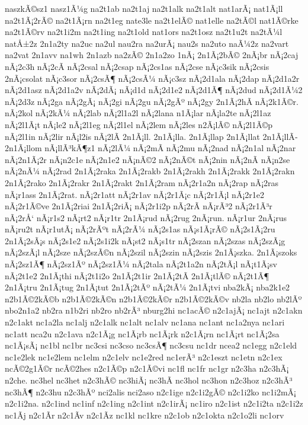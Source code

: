 {naszkÃ©sz1
nasz1Ã¼g
na2t1ab
na2t1aj
na2t1alk
na2t1alt
nat1arÃ¡
nat1Ã¡ll
na2t1Ã¡2rÃ©
na2t1Ã¡rn
na2t1eg
nate3le
na2t1elÃ©
nat1elle
na2tÃ©l
nat1Ã©rke
na2t1Ã©rv
na2t1i2m
na2t1ing
na2t1old
nat1ors
na2t1osz
na2t1u2t
na2tÃ¼l
natÅ±2z
2n1a2ty
na2uc
na2ul
nau2ra
na2urÃ¡
nau2s
na2uto
naÃ¼2z
na2vart
na2vat
2n1avv
na1wh
2n1azb
na2zÃ©
2n1a2zo
1nÃ¡
2n1Ã¡2bÃ©
2nÃ¡br
nÃ¡2caj
nÃ¡2c3h
nÃ¡2cÃ­
nÃ¡2csal
nÃ¡2csap
nÃ¡2cs1as
nÃ¡2cse
nÃ¡c3sik
nÃ¡2csis
2nÃ¡csolat
nÃ¡c3sor
nÃ¡2csÃ¶
nÃ¡2csÃ¼
nÃ¡c3sz
nÃ¡2d1ala
nÃ¡2dap
nÃ¡2d1a2r
nÃ¡2d1asz
nÃ¡2d1a2v
nÃ¡2dÃ¡
nÃ¡d1d
nÃ¡2d1e2
nÃ¡2d1Ã¶
nÃ¡2dud
nÃ¡2d1Ã¼2
nÃ¡2d3z
nÃ¡2ga
nÃ¡2gÃ¡
nÃ¡2gi
nÃ¡2gu
nÃ¡2gÃº
nÃ¡2gy
2n1Ã¡2hÃ­
nÃ¡2k1Ã©r.
nÃ¡2kol
nÃ¡2kÃ¼
nÃ¡2lab
nÃ¡2l1a2l
nÃ¡2lana
n1Ã¡lar
nÃ¡la2te
nÃ¡2l1az
nÃ¡2l1Ã¡t
nÃ¡le2
nÃ¡2l1eg
nÃ¡2l1el
nÃ¡2lem
nÃ¡2les
n2Ã¡lÃ©
nÃ¡2l1Ã©p
nÃ¡2l1in
nÃ¡2lir
nÃ¡l2is
nÃ¡2lÃ­
2n1Ã¡ll.
2n1Ã¡lla.
2n1Ã¡llap
2n1Ã¡llat
2n1Ã¡llÃ­
2n1Ã¡llom
nÃ¡llÃ³kÃ¶z1
nÃ¡2lÃ¼
nÃ¡2mÃ­
nÃ¡2mu
nÃ¡2nad
nÃ¡2n1al
nÃ¡2nar
nÃ¡2n1Ã¡2r
nÃ¡n2c1e
nÃ¡2n1e2
nÃ¡nÃ©2
nÃ¡2nÃ©t
nÃ¡2nin
nÃ¡2nÃ­
nÃ¡n2se
nÃ¡2nÃ¼
nÃ¡2rad
2n1Ã¡2raka
2n1Ã¡2rakb
2n1Ã¡2rakh
2n1Ã¡2rakk
2n1Ã¡2rakn
2n1Ã¡2rako
2n1Ã¡2rakr
2n1Ã¡2rakt
2n1Ã¡2ram
nÃ¡2r1a2n
nÃ¡2rap
nÃ¡2ras
nÃ¡r1ass
2n1Ã¡2rat.
nÃ¡2r1att
nÃ¡2r1av
nÃ¡2r1Ã¡c
nÃ¡2r1Ã¡l
nÃ¡2r1e2
nÃ¡2r1Ã©ve
2n1Ã¡2riai
2n1Ã¡2riÃ¡
nÃ¡2r1i2p
nÃ¡2rÃ­
nÃ¡rÃ³2
nÃ¡2r1Ã³r
nÃ¡2rÅ‘
nÃ¡r1s2
nÃ¡rt2
nÃ¡r1tr
2n1Ã¡rud
nÃ¡2rug
2nÃ¡run.
nÃ¡r1ur
2nÃ¡rus
nÃ¡ru2t
nÃ¡r1utÃ¡
nÃ¡2rÃºt
nÃ¡2rÃ¼
nÃ¡2s1as
nÃ¡s1Ã¡rÃ©
nÃ¡2s1Ã¡2ru
2n1Ã¡2sÃ¡s
nÃ¡2s1e2
nÃ¡2s1i2k
nÃ¡st2
nÃ¡s1tr
nÃ¡2szan
nÃ¡2szas
nÃ¡2szÃ¡g
nÃ¡2szÃ¡l
nÃ¡2sze
nÃ¡2szÃ©n
nÃ¡2szil
nÃ¡2szin
nÃ¡2szis
2n1Ã¡szka.
2n1Ã¡szoks
nÃ¡2sz1Ã¶
nÃ¡2sz1Ãº
nÃ¡2sz1Ã¼
nÃ¡2tala
nÃ¡2t1a2n
nÃ¡2tÃ¡l
nÃ¡t1Ã¡sv
nÃ¡2t1e2
2n1Ã¡thi
nÃ¡2t1i2o
2n1Ã¡2t1ir
2n1Ã¡2tÃ­
2n1Ã¡tlÃ©
nÃ¡2t1Ã¶
2n1Ã¡tru
2n1Ã¡tug
2n1Ã¡tut
2n1Ã¡2tÃº
nÃ¡2tÃ¼
2n1Ã¡tvi
nba2kÃ¡
nba2k1e2
n2b1Ã©2kÃ©b
n2b1Ã©2kÃ©n
n2b1Ã©2kÃ©r
n2b1Ã©2kÃ©v
nb2la
nb2lo
nb2lÃº
nbo2n1a2
nb2ra
n1b2ri
nb2ro
nb2rÃ³
nburg2hi
nc1acÃ©
n2c1ajÃ¡
nc1ajt
n2c1akn
n2c1akt
nc1a2la
nc1alj
n2c1alk
nc1alt
nc1alv
nc1ana
nc1ant
nc1a2nya
nc1ari
nc1att
nca2u
n2c1ava
n2c1Ã¡g
nc1Ã¡rb
nc1Ã¡rk
n2c1Ã¡rn
nc1Ã¡rt
nc1Ã¡2sa
nc1Ã¡sÃ¡
nc1bl
nc1br
nc3csi
nc3cso
nc3csÃ¶
nc3csu
nc1dr
ncea2
nc1egg
n2c1eld
nc1e2lek
nc1e2lem
nc1elm
n2c1elv
nc1e2red
nc1erÃ³
n2c1eszt
nc1etn
n2c1ex
ncÃ©2g1Ã©r
ncÃ©2hes
n2c1Ã©p
n2c1Ã©vi
nc1fl
nc1fr
nc1gr
n2c3ha
n2c3hÃ¡
n2che.
nc3hel
nc3het
n2c3hÃ©
nc3hiÃ¡
nc3hÃ­
nc3hol
nc3hon
n2c3hoz
n2c3hÃ³
nc3hÃ¶
n2c3hu
n2c3hÃº
nci2alis
nci2aso
n2c1ige
n2c1i2gÃ©
n2c1i2ko
nc1i2mÃ¡
n2c1i2na.
n2c1ind
nc1inf
n2c1ing
n2c1int
n2c1irÃ¡
nc1iro
n2c1ist
n2c1i2ta
n2c1i2z
nc1Ã­j
n2c1Ã­r
n2c1Ã­v
n2c1Ã­z
nc1kl
nc1kre
n2c1ob
n2c1okta
n2c1o2li
nc1orv
}
